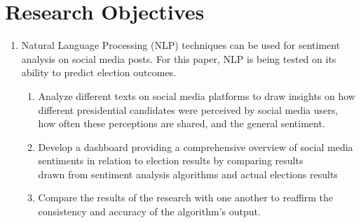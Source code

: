 \section{Research Objectives}
\begin{enumerate}
    \item Natural Language Processing (NLP) techniques can be used for sentiment analysis on social media posts. For this paper, NLP is being tested on its ability to predict election outcomes.
    \begin{enumerate}
        \item Analyze different texts on social media platforms to draw insights on how different presidential candidates were perceived by social media users, how often these perceptions are shared, and the general sentiment.
        \item Develop a dashboard providing a comprehensive overview of social media sentiments in relation to election results by comparing results\\drawn from sentiment analysis algorithms and actual elections results
        \item Compare the results of the research with one another to reaffirm the consistency and accuracy of the algorithm’s output.
    \end{enumerate}
\end{enumerate}